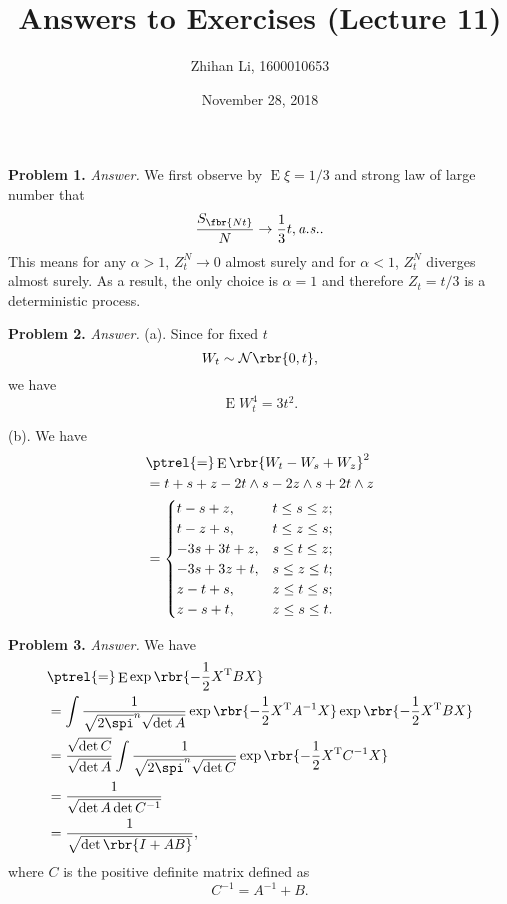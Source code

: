 \documentclass[english, nochinese]{pnote}
\title{Answers to Exercises (Lecture 11)}
\author{Zhihan Li, 1600010653}
\date{November 28, 2018}
\newcommand\noteas{\text{\textit{a.s.}}}
\DeclareMathOperator\ope{\mathrm{E}}
\begin{document}
\maketitle

\textbf{Problem 1.} \textit{Answer.} We first observe by $ \ope \xi = 1 / 3 $ and strong law of large number that
\begin{equation}
\frac{S_{\fbr{ N t }}}{N} \rightarrow \frac{1}{3} t, \noteas.
\end{equation}
This means for any $ \alpha > 1 $, $ Z_t^N \rightarrow 0 $ almost surely and for $ \alpha < 1 $, $Z_t^N$ diverges almost surely. As a result, the only choice is $ \alpha = 1 $ and therefore $ Z_t = t / 3 $ is a deterministic process.

\textbf{Problem 2.} \textit{Answer.} (a). Since for fixed $t$
\begin{equation}
W_t \sim \mathcal{N} \rbr{ 0, t },
\end{equation}
we have
\begin{equation}
\ope W_t^4 = 3 t^2.
\end{equation}

(b). We have
\begin{equation}
\begin{split}
&\ptrel{=} \ope \rbr{ W_t - W_s + W_z }^2 \\
&= t + s + z - 2 t \wedge s - 2 z \wedge s + 2 t \wedge z \\
&=
\begin{cases}
t - s + z, & t \le s \le z; \\
t - z + s, & t \le z \le s; \\
-3 s + 3 t + z, & s \le t \le z; \\
-3 s + 3 z + t, & s \le z \le t; \\
z - t + s, & z \le t \le s; \\
z - s + t, & z \le s \le t.
\end{cases}
\end{split}
\end{equation}

\textbf{Problem 3.} \textit{Answer.} We have
\begin{equation}
\begin{split}
&\ptrel{=} \ope \exp \rbr{ -\frac{1}{2} X^{\text{T}} B X } \\
&= \int \frac{1}{ \sqrt{ 2 \spi }^n \sqrt{ \det A } } \exp \rbr{ -\frac{1}{2} X^{\text{T}} A^{-1} X } \exp \rbr{ -\frac{1}{2} X^{\text{T}} B X } \\
&= \frac{\sqrt{ \det C }}{\sqrt{ \det A }} \int \frac{1}{ \sqrt{ 2 \spi }^n \sqrt{ \det C } } \exp \rbr{ -\frac{1}{2} X^{\text{T}} C^{-1} X } \\
&= \frac{1}{\sqrt{ \det A \det C^{-1} }} \\
&= \frac{1}{\sqrt{ \det \rbr{ I + A B } }},
\end{split}
\end{equation}
where $C$ is the positive definite matrix defined as
\begin{equation}
C^{-1} = A^{-1} + B.
\end{equation}
\end{document}
